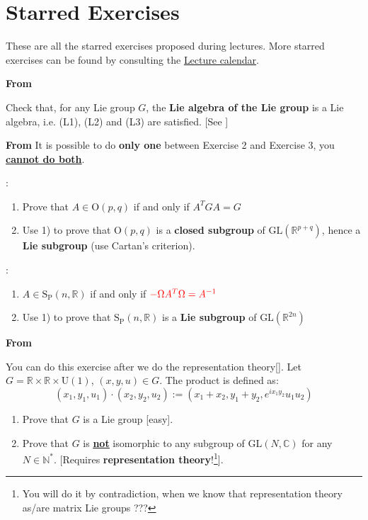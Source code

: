 \documentclass[../main.tex]{subfiles}
\begin{document}
\setchapterpreamble[u]{\margintoc}
\chapter[Starred Exercises]{Starred Exercises\footnotemark[0]}
\setcounter{starredExercise}{0}
These are all the starred exercises proposed during lectures. More starred exercises can be found by consulting the \href{https://elearning.uniroma1.it/pluginfile.php/1149384/mod_resource/content/1/Diario lezioni GTMP 2022 [April 30].pdf}{Lecture calendar}.

\textbf{From }
\hline
\begin{starredExercise}
Check that, for any Lie group $G$, the \textbf{Lie algebra of the Lie group} is a Lie algebra, i.e. (L1), (L2) and (L3) are satisfied. [See ]
\end{starredExercise}
\textbf{From }
\hline
It is possible to do \textbf{only one} between Exercise 2 and Exercise 3, you \underline{\textbf{cannot do both}}.
\begin{starredExercise}:
\begin{enumerate}
    \item Prove that $A\in \textrm{O}(p,q)$ if and only if {\color{red}$A^TGA=G$}
    \item Use 1) to prove that $\textrm{O}(p,q)$ is a \textbf{closed subgroup} of $\textrm{GL}(\mathbb{R}^{p+q})$, hence a \textbf{Lie subgroup} (use Cartan's criterion).
\end{enumerate}
\end{starredExercise}
\begin{starredExercise}:
\begin{enumerate}
    \item $A\in \text{S}_\text{P}(n,\mathbb{R})$ if and only if ${\color{red}-\Omega A^T\Omega=A^{-1}}$
    \item Use 1) to prove that $\text{S}_\text{P}(n,\mathbb{R})$ is a \textbf{Lie subgroup} of $\textrm{GL}(\mathbb{R}^{2n})$
\end{enumerate}
\end{starredExercise}
\textbf{From }
\hline
\begin{starredExercise}
You can do this exercise after we do the representation theory[].
Let $G=\mathbb{R}\times\mathbb{R}\times\text{U}(1)$, $(x,y,u)\in G$. The product is defined as:
\[
(x_1,y_1,u_1)\cdot(x_2,y_2,u_2):=(x_1+x_2,y_1+y_2,e^{ix_1y_2}u_1u_2)
\]
\begin{enumerate}
    \item Prove that $G$ is a Lie group [easy].
    \item Prove that $G$ is \underline{\underline{\textbf{not}}} isomorphic to any subgroup of $\textrm{GL}(N,\mathbb{C})$ for any $N\in\mathbb{N}^\ast$. [Requires \textbf{representation theory}!\footnote{You will do it by contradiction, when we know that representation theory as/are matrix Lie groups ???}].
\end{enumerate}
\end{starredExercise}
\end{document}
